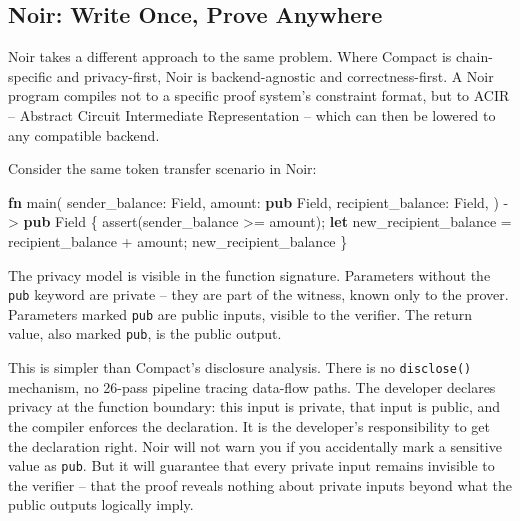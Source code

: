 \documentclass[
  11pt,
  openany]{report}
\newenvironment{Shaded}{\begin{snugshade}}{\end{snugshade}}
\newcommand{\KeywordTok}[1]{\textcolor[rgb]{0.62,0.65,1.00}{\textbf{#1}}}
\newcommand{\NormalTok}[1]{\textcolor[rgb]{0.78,0.80,0.85}{#1}}
\newcommand{\OperatorTok}[1]{\textcolor[rgb]{0.78,0.80,0.85}{#1}}
\renewcommand{\textbf}[1]{{\bfseries\color{MidnightBold}#1}}
\renewenvironment{Shaded}{%
  \begin{tcolorbox}[
    colback=MidnightCode,
    colframe=MidnightBorder,
    arc=4pt,
    boxrule=0.5pt,
    left=8pt, right=8pt, top=6pt, bottom=6pt,
    breakable, enhanced
  ]%
}{\end{tcolorbox}}
\begin{document}
\subsection{Noir: Write Once, Prove
Anywhere}\label{noir-write-once-prove-anywhere}

Noir takes a different approach to the same problem. Where Compact is
chain-specific and privacy-first, Noir is backend-agnostic and
correctness-first. A Noir program compiles not to a specific proof system's
constraint format, but to ACIR -- Abstract Circuit Intermediate Representation
-- which can then be lowered to any compatible backend.

Consider the same token transfer scenario in Noir:

\begin{Shaded}
\begin{Highlighting}[]
\KeywordTok{fn}\NormalTok{ main(}
\NormalTok{    sender\_balance}\OperatorTok{:}\NormalTok{ Field}\OperatorTok{,}
\NormalTok{    amount}\OperatorTok{:} \KeywordTok{pub}\NormalTok{ Field}\OperatorTok{,}
\NormalTok{    recipient\_balance}\OperatorTok{:}\NormalTok{ Field}\OperatorTok{,}
\NormalTok{) }\OperatorTok{{-}\textgreater{}} \KeywordTok{pub}\NormalTok{ Field }\OperatorTok{\{}
\NormalTok{    assert(sender\_balance }\OperatorTok{\textgreater{}=}\NormalTok{ amount)}\OperatorTok{;}
    \KeywordTok{let}\NormalTok{ new\_recipient\_balance }\OperatorTok{=}\NormalTok{ recipient\_balance }\OperatorTok{+}\NormalTok{ amount}\OperatorTok{;}
\NormalTok{    new\_recipient\_balance}
\OperatorTok{\}}
\end{Highlighting}
\end{Shaded}

The privacy model is visible in the function signature. Parameters without the
\texttt{pub} keyword are private -- they are part of the witness, known only to
the prover. Parameters marked \texttt{pub} are public inputs, visible to the
verifier. The return value, also marked \texttt{pub}, is the public output.

This is simpler than Compact's disclosure analysis. There is no
\texttt{disclose()} mechanism, no 26-pass pipeline tracing data-flow paths. The
developer declares privacy at the function boundary: this input is private, that
input is public, and the compiler enforces the declaration. It is the
developer's responsibility to get the declaration right. Noir will not warn you
if you accidentally mark a sensitive value as \texttt{pub}. But it will
guarantee that every private input remains invisible to the verifier -- that the
proof reveals nothing about private inputs beyond what the public outputs
logically imply.
\end{document}
